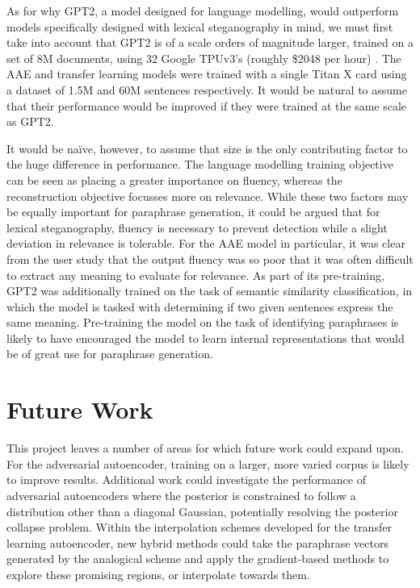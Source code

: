\documentclass[12pt,a4paper]{article}
\begin{document}
As for why GPT2, a model designed for language modelling, would outperform models specifically designed with lexical steganography in mind, we must first take into account that GPT2 is of a scale orders of magnitude larger, trained on a set of 8M documents, using 32 Google TPUv3's (roughly \$2048 per hour) \cite{gpt2}. The AAE and transfer learning models were trained with a single Titan X card using a dataset of 1.5M and 60M sentences respectively. It would be natural to assume that their performance would be improved if they were trained at the same scale as GPT2. 

It would be na\"ive, however, to assume that size is the only contributing factor to the huge difference in performance. The language modelling training objective can be seen as placing a greater importance on fluency, whereas the reconstruction objective focusses more on relevance. While these two factors may be equally important for paraphrase generation, it could be argued that for lexical steganography, fluency is necessary to prevent detection while a slight deviation in relevance is tolerable. For the AAE model in particular, it was clear from the user study that the output fluency was so poor that it was often difficult to extract any meaning to evaluate for relevance. As part of its pre-training, GPT2 was additionally trained on the task of semantic similarity classification, in which the model is tasked with determining if two given sentences express the same meaning. Pre-training the model on the task of identifying paraphrases is likely to have encouraged the model to learn internal representations that would be of great use for paraphrase generation.


\section{Future Work}

\noindent This project leaves a number of areas for which future work could expand upon. For the adversarial autoencoder, training on a larger, more varied corpus is likely to improve results. Additional work could investigate the performance of adversarial autoencoders where the posterior is constrained to follow a distribution other than a diagonal Gaussian, potentially resolving the posterior collapse problem. Within the interpolation schemes developed for the transfer learning autoencoder, new hybrid methods could take the paraphrase vectors generated by the analogical scheme and apply the gradient-based methods to explore these promising regions, or interpolate towards them.
\end{document}

